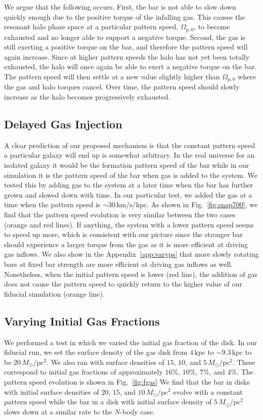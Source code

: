 \documentclass[twocolumn,linenumbers]{aastex631}
\newcommand{\Nbody}{$N$-body}
\newcommand{\Msun}{\ensuremath{M_{\odot}}}
\begin{document}
We argue that the following occurs. First, the bar is not able to slow down
quickly enough due to the positive torque of the infalling gas. This causes
the resonant halo phase space at a particular pattern speed, $\Omega_{\textrm{p},0}$,
to become exhausted and no longer able to support a negative torque. Second,
the gas is still exerting a positive torque on the bar, and therefore the
pattern speed will again increase. Since at higher pattern speeds the halo has
not yet been totally exhausted, the halo will once again be able to exert a
negative torque on the bar. The pattern speed will then settle at a new value
slightly higher than $\Omega_{\textrm{p},0}$ where the gas and halo torques cancel.
Over time, the pattern speed should slowly increase as the halo becomes
progressively exhausted.

\subsection{Delayed Gas Injection}
A clear prediction of our proposed mechanism is that the constant pattern speed
a particular galaxy will end up is somewhat arbitrary. In the real universe for
an isolated galaxy it would be the formation pattern speed of the bar while in
our simulation it is the pattern speed of the bar when gas is added to the
system. We tested this by adding gas to the system at a later time when the bar
has further grown and slowed down with time. In our particular test, we added
the gas at a time when the pattern speed is
$\sim30\,\textrm{km}/\textrm{s}/\textrm{kpc}$. As shown in
Fig.~\ref{fig:snap700}, we find that the pattern speed evolution is very similar
between the two cases (orange and red lines). If anything, the system with a
lower pattern speed seems to speed up more, which is consistent with our picture
since the stronger bar should experience a larger torque from the gas as it is
more efficient at driving gas inflows. We also show in the
Appendix~\ref{app:varyps} that more slowly rotating bars at fixed bar strength
are more efficient at driving gas inflows as well. Nonetheless, when the initial
pattern speed is lower (red line), the addition of gas does not cause the
pattern speed to quickly return to the higher value of our fiducial simulation
(orange line).



\subsection{Varying Initial Gas Fractions}
We performed a test in which we varied the initial gas fraction of the
disk. In our fiducial run, we set the surface density of the gas disk from
$4\,\textrm{kpc}$ to $\sim9.3\,\textrm{kpc}$ to be $20\,\Msun/\textrm{pc}^2$.
We also ran with surface densities of $15$, $10$, and
$5\,\Msun/\textrm{pc}^2$. These correspond to initial gas fractions of
approximately $16\%$, $10\%$, $7\%$, and $4\%$. The pattern speed evolution is
shown in Fig.~\ref{fig:fgas} We find that the bar in disks with
initial surface densities of $20$, $15$, and $10\,\Msun/\textrm{pc}^2$ evolve
with a constant pattern speed while the bar in a disk with initial surface
density of $5\,\Msun/\textrm{pc}^2$ slows down at a similar rate to the \Nbody{} case.
\end{document}
